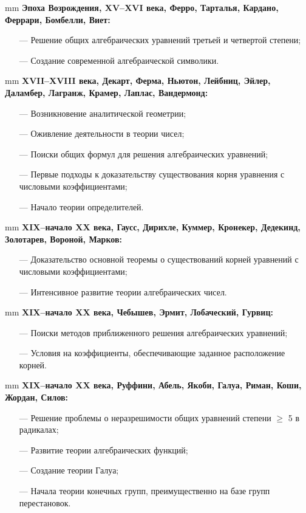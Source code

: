 \documentclass[12pt,english,russian]{article}
\begin{document}
	 mm
	{\bf Эпоха Возрождения, XV–XVI века, Ферро, Тарталья,
	Кардано, Феррари, Бомбелли, Виет:}
	\begin{enumerate}
	\item[---] Решение общих алгебраических уравнений третьей и четвертой степени;
	\item[---] Создание современной алгебраической символики.
	\end{enumerate}
	
	 mm
	{\bf XVII–XVIII века, Декарт, Ферма, Ньютон, Лейбниц, Эйлер, Даламбер, Лагранж, Крамер, Лаплас, Вандермонд:}
	\begin{enumerate}
	\item[---] Возникновение аналитической геометрии;
	\item[---] Оживление деятельности в теории чисел;
	\item[---] Поиски общих формул для решения алгебраических уравнений;
	\item[---] Первые подходы к доказательству существования корня уравнения с числовыми коэффициентами;
	\item[---] Начало теории определителей.
	\end{enumerate}

	 mm
	{\bf XIX–начало XX века, Гаусс, Дирихле, Куммер, Кронекер, Дедекинд, Золотарев, Вороной, Марков:}
	\begin{enumerate}
	\item[---] Доказательство основной теоремы о существований корней уравнений с числовыми коэффициентами;
	\item[---] Интенсивное развитие теории алгебраических чисел.
	\end{enumerate}
	
	 mm
	{\bf XIX–начало XX века, Чебышев, Эрмит, Лобаческий, Гурвиц:}
	\begin{enumerate}
	\item[---] Поиски методов приближенного решения алгебраических уравнений;
	\item[---] Условия на коэффициенты, обеспечивающие заданное расположение корней.
	\end{enumerate}
	
	 mm
	{\bf XIX–начало XX века, Руффини, Абель, Якоби, Галуа, Риман, Коши, Жордан, Силов:}
	\begin{enumerate}
	\item[---] Решение проблемы о неразрешимости общих уравнений степени $\geqslant$ 5 в радикалах;
	\item[---] Развитие теории алгебраических функций;
	\item[---] Создание теории Галуа;
	\item[---] Начала теории конечных групп, преимущественно на базе групп перестановок.
	\end{enumerate}
\end{document}

